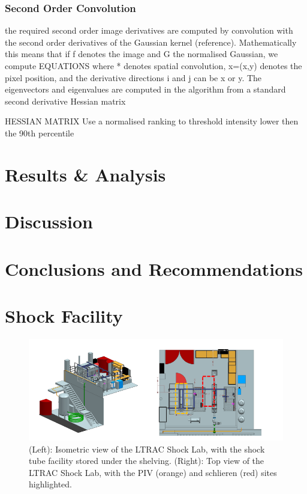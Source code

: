 \subsubsection{Second Order Convolution}
the required second order image derivatives are computed by convolution with the second order derivatives of the Gaussian kernel (reference). Mathematically this means that if f denotes the image and G the normalised Gaussian, we compute
EQUATIONS
where * denotes spatial convolution, x=(x,y) denotes the pixel position, and the derivative directions i and j can be x or y. The eigenvectors and eigenvalues are computed in the algorithm from a standard second derivative Hessian matrix 

HESSIAN MATRIX
Use a normalised ranking to threshold intensity lower then the 90th percentile 

\newpage
\section{Results \& Analysis}

\newpage
\section{Discussion}

\newpage
\section{Conclusions and Recommendations}

\newpage



\normalsize
\newpage

\appendix
{}

\section{Shock Facility} \label{app:facility}

\begin{figure}[H] 
	\centering
	\includegraphics[width=1.05\textwidth]{fig10.PNG} 
	\caption{(Left): Isometric view of the LTRAC Shock Lab, with the shock tube facility stored under the
		shelving. (Right): Top view of the LTRAC Shock Lab, with the PIV (orange) and schlieren (red) sites
		highlighted.}
	\label{fig:10}
\end{figure}

